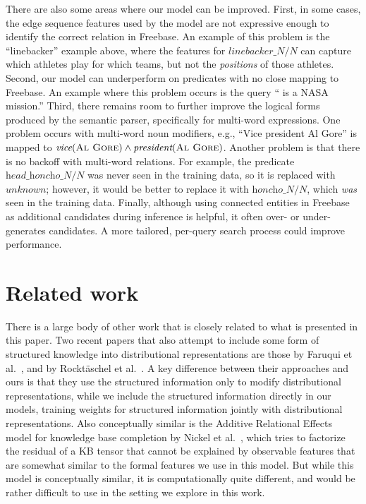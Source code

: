 \documentclass[11pt]{article}
\newcommand{\blank}{\underline{\hspace{.5cm}}}
\newcommand{\lexicalpredicate}[1]{\ensuremath{\textit{#1}}}
\newcommand{\entity}[1]{\ensuremath{\textsc{#1}}}
\begin{document}
There are also some areas where our model can be improved. First, in
some cases, the edge sequence features used by the model are not
expressive enough to identify the correct relation in Freebase. An
example of this problem is the ``linebacker'' example above, where the
features for \lexicalpredicate{linebacker\_N/N} can capture which athletes
play for which teams, but not the \emph{positions} of those
athletes. Second, our model can underperform on predicates with no
close mapping to Freebase. An example where this problem occurs is the
query ``\blank{} is a NASA mission.'' Third, there remains room to
further improve the logical forms produced by the semantic parser,
specifically for multi-word expressions. One problem occurs with
multi-word noun modifiers, e.g., ``Vice president Al Gore'' is mapped
to $\lexicalpredicate{vice}(\entity{Al Gore}) \land
\lexicalpredicate{president}(\entity{Al Gore})$. Another problem is that
there is no backoff with multi-word relations. For example, the
predicate \lexicalpredicate{head\_honcho\_N/N} was never seen in the training
data, so it is replaced with \lexicalpredicate{unknown}; however, it would be
better to replace it with \lexicalpredicate{honcho\_N/N}, which \emph{was}
seen in the training data. Finally, although using connected entities
in Freebase as additional candidates during inference is helpful, it
often over- or under-generates candidates. A more tailored, per-query
search process could improve performance.

\section{Related work}

There is a large body of other work that is closely related to what is
presented in this paper.  Two recent papers that also attempt to
include some form of structured knowledge into distributional
representations are those by Faruqui et
al.~, and by
Rockt\"{a}schel et
al.~.  A key difference
between their approaches and ours is that they use the structured
information only to modify distributional representations, while we
include the structured information directly in our models, training
weights for structured information jointly with distributional
representations.  Also conceptually similar is the Additive Relational
Effects model for knowledge base completion by Nickel et
al.~, which tries to factorize the residual
of a KB tensor that cannot be explained by observable features that
are somewhat similar to the formal features we use in this model.  But
while this model is conceptually similar, it is computationally quite
different, and would be rather difficult to use in the setting we
explore in this work.
\end{document}
